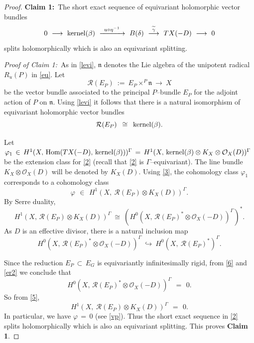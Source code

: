 \documentclass[12pt, reqno]{amsart}
\numberwithin{equation}{section}
\begin{document}
\begin{proof}
\textbf{Claim 1:}\, The short exact sequence of equivariant holomorphic vector bundles
\begin{equation}\label{2}
0\ \longrightarrow\ {\rm kernel}(\beta)\ \xrightarrow{\,\,\,u\circ\eta^{-1}\,\,\,}\ B(\delta)
\ \overset{\widetilde{\gamma}}\longrightarrow\ TX(-D)\ \longrightarrow\ 0
\end{equation}
splits holomorphically which is also an equivariant splitting.

{\it Proof of Claim 1:}\, As in \eqref{levi}, $\mathfrak{n}$ denotes the Lie algebra of the
unipotent radical $R_u(P)$ in \eqref{eu}. Let
$$
\mathcal{R}(E_{P})\ :=\ E_P\times^P \mathfrak{n}\ \longrightarrow\ X
$$
be the vector bundle associated to the principal $P$--bundle $E_P$ for the adjoint action
of $P$ on $\mathfrak{n}$. Using \eqref{levi} it follows that there is a natural isomorphism of equivariant
holomorphic vector bundles 
\begin{equation}\label{3}
\mathcal{R}(E_{P})\,\ \cong\,\ {\rm kernel}(\beta).
\end{equation}

Let $\varphi_1\, \in\, H^1(X,\, \text{Hom}(TX(-D),\, {\rm kernel}(\beta)))^\Gamma\,=\,
H^1(X,\, {\rm kernel}(\beta)\otimes K_X\otimes{\mathcal O}_X(D))^\Gamma$ be the extension class for \eqref{2}
(recall that \eqref{2} is $\Gamma$--equivariant). The line bundle $K_X\otimes{\mathcal O}_X(D)$ will be
denoted by $K_X(D)$. Using \eqref{3}, the cohomology class $\varphi_1$ corresponds to a cohomology class
\begin{equation}\label{vp}
\varphi\,\ \in\, \ H^1(X,\ \mathcal{R}(E_{P})\otimes K_X(D))^\Gamma.
\end{equation}
By Serre duality,
\begin{equation}\label{5}
H^{1}(X,\, \mathcal{R}(E_{P})\otimes K_{X}(D))^{\Gamma}\ \cong\ (H^{0}(X,\,
\mathcal{R}(E_{P})^{*}\otimes \mathcal{O}_{X}(-D))^\Gamma)^{*}.
\end{equation}
As $D$ is an effective divisor, there is a natural inclusion map 
\begin{equation}\label{6} 
H^{0}(X,\, \mathcal{R}(E_{P})^{*}\otimes\mathcal{O}_{X}(-D))^{\Gamma}\ \hookrightarrow\
H^{0}(X,\ \mathcal{R}(E_{P})^{*})^{\Gamma}.
\end{equation}

Since the reduction $E_P\, \subset\, E_G$ is equivariantly infinitesimally rigid, from \eqref{6} and
\eqref{er2} we conclude that
$$
H^{0}(X,\, \mathcal{R}(E_{P})^{*}\otimes\mathcal{O}_{X}(-D))^{\Gamma}\ \,=\ \, 0.
$$
So from \eqref{5},
$$
H^{1}(X,\ \mathcal{R}(E_{P})\otimes K_{X}(D))^{\Gamma}\,\ =\, \ 0.
$$
In particular, we have $\varphi\,=\, 0$ (see \eqref{vp}). Thus the short exact sequence
in \eqref{2} splits holomorphically which is also an equivariant splitting.
This proves \textbf{Claim 1}.


\end{proof}
\end{document}
